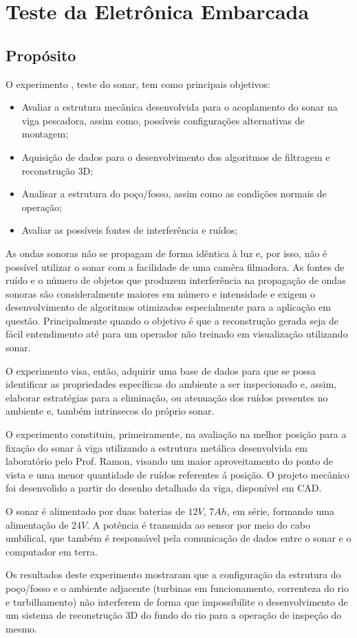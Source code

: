 

\section{Teste da Eletrônica Embarcada}
\subsection{Propósito}
\label{proposito_sonar}
O experimento %
, teste do sonar, tem como principais objetivos:
 \begin{itemize}
 \item Avaliar a estrutura mecânica desenvolvida para o acoplamento do sonar na
 viga pescadora, assim como, possíveis configurações alternativas de montagem;
 \item Aquisição de dados para o desenvolvimento dos algoritmos de filtragem e
 reconstrução 3D;
 \item Analisar a estrutura do poço/fosso, %
  assim como as condições normais de operação;
 \item Avaliar as possíveis fontes de interferência e ruídos;
 \end{itemize}

As ondas sonoras nâo se propagam de forma idêntica à luz e, por isso, não é
possível utilizar o sonar com a facilidade de uma camêra filmadora. As fontes de
ruído e o número de objetos que produzem interferência na propagação de ondas
sonoras sâo consideralmente maiores em número e intensidade e exigem o
desenvolvimento de algoritmos otimizados especialmente para a aplicação em
questão. Principalmente quando o objetivo é que a reconstrução gerada seja de
fácil entendimento até para um operador não treinado em visualização
utilizando sonar.

O experimento visa, então, adquirir uma base de dados para que se possa
identificar as propriedades específicas do ambiente a ser inspecionado e, assim, 
elaborar estratégias para a eliminação, ou atenuação dos ruídos presentes no
ambiente e, também intrinsecos do próprio sonar.

O experimento constituiu, primeiramente, na avaliação na melhor posição
para a fixação do sonar à viga utilizando a estrutura metálica desenvolvida em
laboratório pelo Prof. Ramon, visando um maior aproveitamento do ponto de vista
e uma menor quantidade de ruídos referentes á posição. O projeto mecânico foi
desenvolido a partir do desenho detalhado da viga, disponível em CAD.

O sonar é alimentado por duas baterias de $12V$, $7Ah$, em série, formando uma
alimentação de $24V$. A potência é transmida ao sensor por meio do cabo
umbilical, que também é responsável pela comunicação de dados entre o sonar e o
computador em terra.

Os resultados deste experimento mostraram que a configuração da estrutura do
poço/fosso e o ambiente adjacente (turbinas em funcionamento, correnteza do rio
e turbilhamento) não interferem de forma que impossibilite o desenvolvimento de
um sistema de reconstrução 3D do fundo do rio para a operação de inspeção do
mesmo.
